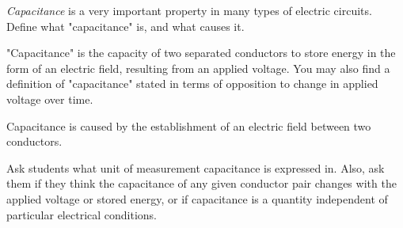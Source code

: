 

{\it Capacitance} is a very important property in many types of electric circuits.  Define what "capacitance" is, and what causes it.







"Capacitance" is the capacity of two separated conductors to store energy in the form of an electric field, resulting from an applied voltage.  You may also find a definition of "capacitance" stated in terms of opposition to change in applied voltage over time.

\vskip 10pt

Capacitance is caused by the establishment of an electric field between two conductors.







Ask students what unit of measurement capacitance is expressed in.  Also, ask them if they think the capacitance of any given conductor pair changes with the applied voltage or stored energy, or if capacitance is a quantity independent of particular electrical conditions.




